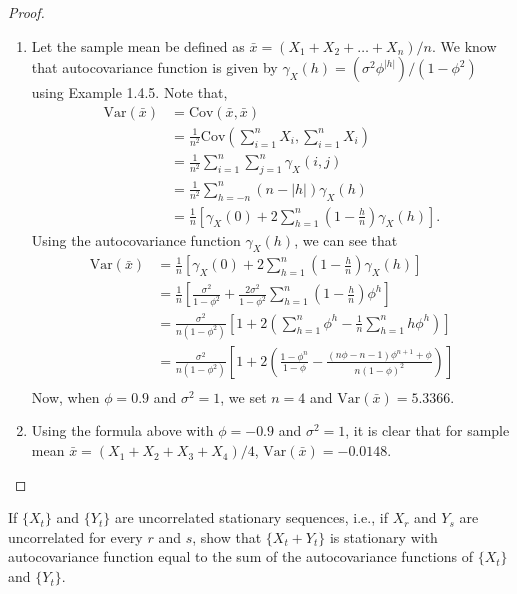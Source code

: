 \documentclass[12pt]{article}
\theoremstyle{definition}
\newenvironment{custompbm}[1]
  {\renewcommand\theproblem{#1}\problem}
  {\endproblem}
\newcommand{\V}{\text{Var}}
\newcommand{\Co}[2]{\text{Cov}({#1}, {#2})}
\begin{document}
\begin{proof}
  \begin{enumerate}
    \item Let the sample mean be defined as $\bar{x} = (X_1 + X_2 + \dots + X_n) / n$.
      We know that autocovariance function is given by
      $\gamma_X(h) = (\sigma^2\phi ^ {|h|} ) / (1 - \phi^2)$ using Example 1.4.5.
      Note that,
      \begin{align*}
        \V(\bar{x}) &= \Co{\bar{x}}{\bar{x}} \\
        &= \frac{1}{n^2}\text{Cov}\left(\sum_{i=1}^n X_i, \sum_{i=1}^n X_i\right) \\
        &= \frac{1}{n^2}\sum_{i=1}^{n} \sum_{j=1}^n \gamma_X(i,j) \\
        &= \frac{1}{n^2}\sum_{h=-n}^{n} (n - |h|)\gamma_X(h)\\
        &= \frac{1}{n}\left[\gamma_X(0) + 2\sum_{h=1}^{n}\left(1-\frac{h}{n}\right)\gamma_X(h)\right].
      \end{align*}
      Using the autocovariance function $\gamma_X(h)$, we can see that
      \begin{align*}
        \V(\bar{x}) &= \frac{1}{n}\left[\gamma_X(0) + 2\sum_{h=1}^{n}\left(1-\frac{h}{n}\right)\gamma_X(h)\right] \\
        &= \frac{1}{n}\left[\frac{\sigma^2}{1-\phi^2} + \frac{2\sigma^2}{1-\phi^2}\sum_{h=1}^n \left(1-\frac{h}{n}\right)\phi^h \right] \\
        &= \frac{\sigma^2}{n(1-\phi^2)}\left[1 + 2\left(\sum_{h=1}^n \phi^h- \frac{1}{n}\sum_{h=1}^n h\phi^h \right)\right] \\
        &= \frac{\sigma^2}{n(1-\phi^2)}\left[1 + 2\left(\frac{1-\phi^n}{1-\phi}- \frac{(n\phi - n - 1)\phi^{n+1} + \phi}{n(1-\phi)^2}\right)\right] \\
      \end{align*}
      Now, when $\phi = 0.9$ and $\sigma^2 = 1$, we set $n=4$ and $\V(\bar{x}) = 5.3366$.
    \item Using the formula above with $\phi = -0.9$ and $\sigma^2 = 1$, it is
      clear that for sample mean $\bar{x} = (X_1 + X_2 + X_3 + X_4) / 4$, $\V(\bar{x}) = -0.0148$.
  \end{enumerate}
\end{proof}


\begin{custompbm}{1.7}
  If $\{ X_t \}$ and $\{ Y_t \}$ are uncorrelated stationary sequences, i.e.,
  if $X_r$ and $Y_s$ are uncorrelated for every $r$ and $s$, show that
  $\{ X_t + Y_t \}$ is stationary with autocovariance function equal to the sum
  of the autocovariance functions of $\{ X_t \}$ and $\{ Y_t \}$.
\end{custompbm}
\end{document}
